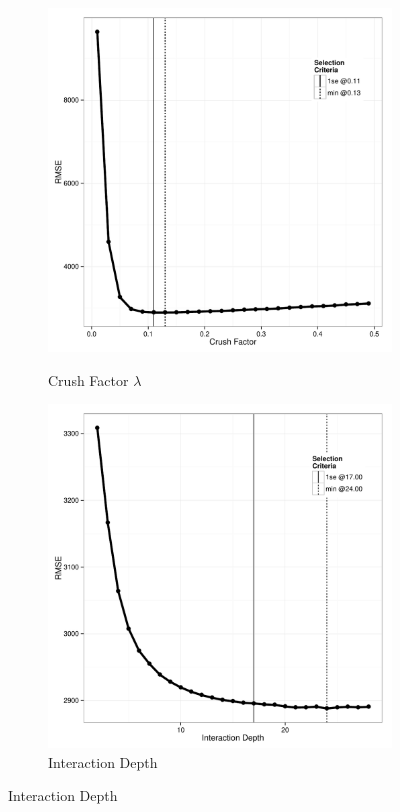 \documentclass[11pt, fleqn]{article}
\begin{document}
\begin{figure}
  \centering
  \begin{subfigure}[b]{0.44\textwidth}
    \caption{Crush Factor $\lambda$}
    \includegraphics[width=\textwidth]{gbm_shrink.pdf}
    \label{fig:gbm_shrink}
  \end{subfigure}
  \hfill
  \begin{subfigure}[b]{0.44\textwidth}
    \caption{Interaction Depth}
    \includegraphics[width=\textwidth]{gbm_indepth.pdf}

\end{subfigure}
\end{figure}
\end{document}
